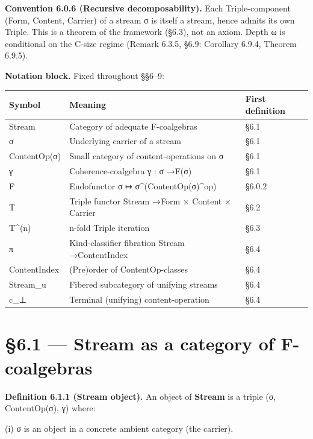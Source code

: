 \documentclass[11pt, openany]{book}
\newcommand{\sectionbreak}{\clearpage}
\begin{document}
\textbf{Convention 6.0.6 (Recursive decomposability).} Each Triple-component (Form, Content, Carrier) of a stream σ is itself a stream, hence admits its own Triple. This is a theorem of the framework (§6.3), not an axiom. Depth ω is conditional on the C-size regime (Remark 6.3.5, §6.9: Corollary 6.9.4, Theorem 6.9.5).

\textbf{Notation block.} Fixed throughout §§6–9:

\begingroup\setlength{\tabcolsep}{3pt}\renewcommand{\arraystretch}{1.15}\footnotesize
\begin{longtable}{p{0.68in} p{2.74in} p{0.91in}}
\toprule
Symbol & Meaning & First definition \\
\midrule
\endhead
\bottomrule
\endfoot
Stream & Category of adequate F-coalgebras & §6.1 \\
\midrule
σ & Underlying carrier of a stream & §6.1 \\
\midrule
ContentOp(σ) & Small category of content-operations on σ & §6.1 \\
\midrule
γ & Coherence-coalgebra γ : σ →\allowbreak  F(σ) & §6.1 \\
\midrule
F & Endofunctor σ ↦ σ\textasciicircum{}(ContentOp(σ)\textasciicircum{}op) & §6.0.2 \\
\midrule
T & Triple functor Stream →\allowbreak  Form × Content × Carrier & §6.2 \\
\midrule
T\textasciicircum{}(n) & n-fold Triple iteration & §6.3 \\
\midrule
π & Kind-classifier fibration Stream →\allowbreak  ContentIndex & §6.4 \\
\midrule
ContentIndex & (Pre)order of ContentOp-classes & §6.4 \\
\midrule
Stream\_\allowbreak{}u & Fibered subcategory of unifying streams & §6.4 \\
\midrule
c\_\allowbreak{}⊥ & Terminal (unifying) content-operation & §6.4 \\
\bottomrule
\end{longtable}
\endgroup
\sectionbreak

\section{§6.1 --- Stream as a category of F-coalgebras}

\textbf{Definition 6.1.1 (Stream object).} An object of \textbf{Stream} is a triple (σ, ContentOp(σ), γ) where:

(i) σ is an object in a concrete ambient category (the carrier).
\end{document}
